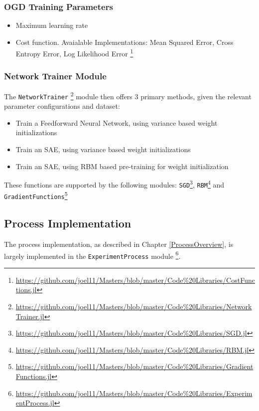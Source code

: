\documentclass[a4paper,11pt,oneside]{article}
\theoremstyle{plain}
\theoremstyle{definition}
\begin{document}
\subsubsection{OGD Training Parameters}
\begin{itemize}
	\item[1] Maximum learning rate
	\item[2] Cost function. Avaialable Implementations: Mean Squared Error, Cross Entropy Error, Log Likelihood Error \footnote{\url{https://github.com/joel11/Masters/blob/master/Code\%20Libraries/CostFunctions.jl}}
\end{itemize}	

\subsubsection{Network Trainer Module}

The \texttt{NetworkTrainer} \footnote{\url{https://github.com/joel11/Masters/blob/master/Code\%20Libraries/NetworkTrainer.jl}} module then offers 3 primary methods, given the relevant parameter configurations and dataset:

\begin{itemize}
	\item[1] Train a Feedforward Neural Network, using variance based weight initializations 
	\item[2] Train an SAE, using variance based weight initializations
	\item[3] Train an SAE, using RBM based pre-training for weight initialization
\end{itemize}

These functions are supported by the following modules: \texttt{SGD}\footnote{\url{https://github.com/joel11/Masters/blob/master/Code\%20Libraries/SGD.jl}}, \texttt{RBM}\footnote{\url{https://github.com/joel11/Masters/blob/master/Code\%20Libraries/RBM.jl}} and \newline  \texttt{GradientFunctions}\footnote{\url{https://github.com/joel11/Masters/blob/master/Code\%20Libraries/GradientFunctions.jl}}

\subsection{Process Implementation}

The process implementation, as described in Chapter \ref{ProcessOverview}, is largely implemented in the \texttt{ExperimentProcess} module \footnote{\url{https://github.com/joel11/Masters/blob/master/Code\%20Libraries/ExperimentProcess.jl}}.
\end{document}
